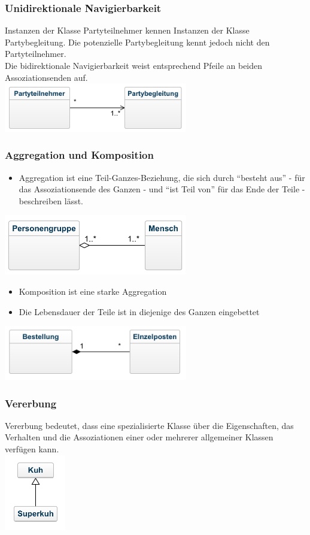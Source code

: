 \begin{frame}
\frametitle{Unidirektionale Navigierbarkeit}
	Instanzen der Klasse Partyteilnehmer kennen Instanzen der Klasse
	Partybegleitung. Die potenzielle Partybegleitung kennt jedoch nicht
	den Partyteilnehmer.
	\\
	Die bidirektionale Navigierbarkeit weist entsprechend Pfeile an beiden
	Assoziationsenden auf.
	\\
	\center
	\includegraphics[width=0.6\textwidth,
	keepaspectratio=true]{bilder/asso_navi2.png}
\end{frame}

\begin{frame}
\frametitle{Aggregation und Komposition}
	\begin{itemize}
		\item Aggregation ist eine Teil-Ganzes-Beziehung, die sich durch ``besteht aus''
		- für das Assoziationsende des Ganzen - und ``ist Teil von'' für das Ende der Teile
		- beschreiben lässt.
	\end{itemize}
	\includegraphics[width=0.6\textwidth,
	keepaspectratio=true]{bilder/asso_agg.png}
	\begin{itemize}
		\item Komposition ist eine starke Aggregation
		\item Die Lebensdauer der Teile ist in diejenige des Ganzen eingebettet
	\end{itemize}
	\includegraphics[width=0.6\textwidth,
	keepaspectratio=true]{bilder/asso_comp.png}
\end{frame}

\begin{frame}
\frametitle{Vererbung}
	Vererbung bedeutet, dass eine spezialisierte Klasse über die Eigenschaften,
	das Verhalten und die Assoziationen einer oder mehrerer allgemeiner Klassen
	verfügen kann.
	\\
	\center
	\includegraphics[width=0.2\textwidth,
	keepaspectratio=true]{bilder/asso_vererbung.png}
\end{frame}

